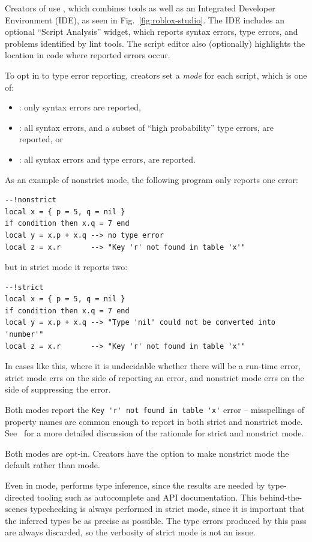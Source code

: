 \documentclass[
  acmsmall,
  review,
  anonymous,
]{acmart}
\begin{document}
Creators of  use ,
which combines  tools as well as an Integrated
Developer Environment (IDE), as seen in Fig.~\ref{fig:roblox-studio}.
The IDE includes an optional ``Script Analysis'' widget, which
reports syntax errors, type errors, and problems identified by
lint tools. The script editor also (optionally) highlights
the location in code where reported errors occur.

To opt in to type error reporting, creators set a \emph{mode}
for each script, which is one of:
\begin{itemize}
  \item \mnocheck{}: only syntax errors are reported,
  \item \mnonstrict{}: all syntax errors, and a subset of ``high probability'' type errors, are reported, or
  \item \mstrict{}: all syntax errors and type errors, are reported.
\end{itemize}
As an example of nonstrict mode, the following program only reports one error:
\begin{verbatim}
--!nonstrict
local x = { p = 5, q = nil }
if condition then x.q = 7 end
local y = x.p + x.q --> no type error
local z = x.r       --> "Key 'r' not found in table 'x'"
\end{verbatim}
but in strict mode it reports two:
\begin{verbatim}
--!strict
local x = { p = 5, q = nil }
if condition then x.q = 7 end
local y = x.p + x.q --> "Type 'nil' could not be converted into 'number'"
local z = x.r       --> "Key 'r' not found in table 'x'"
\end{verbatim}
In cases like this, where it is undecidable whether there will be a run-time error,
strict mode errs on the side of reporting an error, and nonstrict mode errs on
the side of suppressing the error.

Both modes report the \verb|Key 'r' not found in table 'x'| error --
misspellings of property names are common enough to report in both
strict and nonstrict mode. See~
for a more detailed discussion of the rationale for strict and nonstrict mode.

Both modes are opt-in. Creators have the option to make nonstrict mode
the default rather than \mnocheck{} mode.

Even in \mnocheck{} mode,  performs type inference, since
the results are needed by type-directed tooling such as autocomplete and
API documentation. This behind-the-scenes typechecking is always performed
in strict mode, since it is important that the inferred types be as precise
as possible. The type errors produced by this pass are always discarded,
so the verbosity of strict mode is not an issue.
\end{document}
